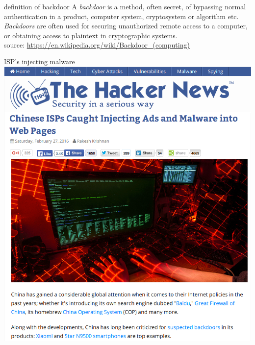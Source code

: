 \documentclass[11pt]{beamer}
\begin{document}
\begin{frame}{definition of backdoor}
A \emph{backdoor} is a method, often secret, of bypassing normal authentication in a product, computer system, cryptosystem or algorithm etc.
\\[0.2cm]
\emph{Backdoors} are often used for securing unauthorized remote access to a computer, or obtaining access to plaintext in cryptographic systems.
\\[0.2cm]
source: \href{https://en.wikipedia.org/wiki/Backdoor\textunderscore(computing)}{https://en.wikipedia.org/wiki/Backdoor\_(computing)}
\end{frame}

\begin{frame}{ISP's injecting malware}
\includegraphics[scale=0.28]{isp_malware.png}
\end{frame}
\end{document}
